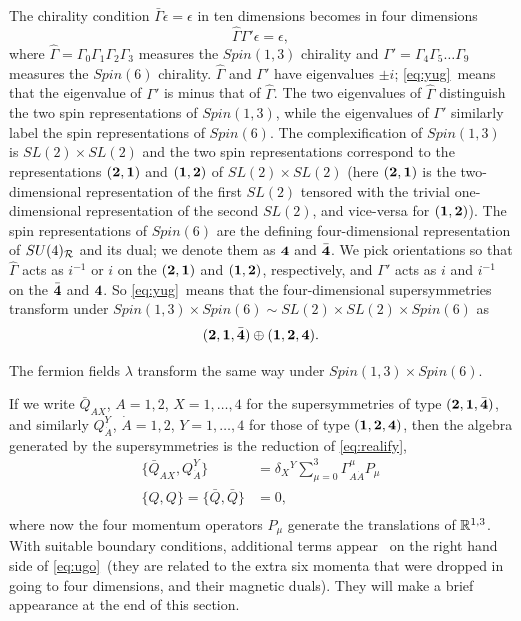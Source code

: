 \def\btwo{{\bf 2}}
\def\bone{{\bf 1}}
\def\b4{{\bf 4}}
\def\bb4{\bar{\bf 4}}
 The chirality condition $\bar\Gamma\epsilon=\epsilon$ in ten
dimensions becomes in four dimensions %
\setcounter{equation}{12}
\begin{equation}\label{eq:yug}
\hat\Gamma
\Gamma'\epsilon=\epsilon,
\end{equation}
 where
$\hat\Gamma=\Gamma_0\Gamma_1\Gamma_2\Gamma_3$ measures the
$Spin(1,3)$ chirality and $\Gamma'=\Gamma_4\Gamma_5\dots\Gamma_9$
measures the $Spin(6)$ chirality. $\hat \Gamma$ and $\Gamma'$ have
eigenvalues $\pm i$; \eqref{eq:yug}\ means that the eigenvalue of $\Gamma'$
is minus that of $\hat \Gamma$. The two eigenvalues of
$\hat\Gamma$ distinguish the two spin representations  of
$Spin(1,3)$, while the eigenvalues of $\Gamma'$ similarly label
the spin representations of $Spin(6)$. The complexification of
$Spin(1,3)$ is $SL(2)\times SL(2)$ and the two spin
representations correspond to the representations $({\bf 2},{\bf
1})$ and $({\bf 1},{\bf 2})$ of $SL(2)\times SL(2)$ (here $({\bf
2},{\bf 1})$ is the two-dimensional representation of the first
$SL(2)$ tensored with the trivial one-dimensional representation
of the second $SL(2)$, and vice-versa for $(\bone,\btwo)$). The
spin representations of $Spin(6)$ are the defining
four-dimensional representation of $SU(4)_{{\cal R}}$ and its
dual; we denote them as ${\bf 4}$ and $\bar{\bf 4}$. We pick
orientations so that $\hat \Gamma$ acts as $i^{-1}$ or $i$ on the
$({\bf 2},{\bf 1})$ and $({\bf 1},{\bf 2})$, respectively, and
$\Gamma'$ acts as $i$ and $i^{-1}$ on the $\bar {\bf 4}$ and ${\bf
4}$.
 So
\eqref{eq:yug}\ means that the four-dimensional supersymmetries transform
under $Spin(1,3)\times Spin(6)\sim SL(2)\times SL(2)\times
Spin(6)$ as %
\setcounter{equation}{13}
\begin{equation}\label{eq:jugo}
(\btwo,\bone,\bb4)\oplus (\bone,\btwo,\b4).
\end{equation}

The fermion fields $\lambda$ transform the same way under
$Spin(1,3)\times Spin(6)$.

If we write $\bar Q_{AX}$, $A=1,2$, $X=1,\dots, 4$ for the
supersymmetries of type $({\bf 2},\bone,\bar{\bf 4})$, and
similarly $ Q_{\dot A }^Y$, $\dot A=1,2$, $Y=1,\dots,4$ for those
of type $(\bone,{\bf 2},{\bf  4})$, then the algebra generated by
the supersymmetries is the reduction of \eqref{eq:realify},
\setcounter{equation}{14}
\begin{equation}\label{eq:ugo}
\begin{aligned}\{\bar Q_{AX}, Q_{\dot A}^
Y\}&=\delta_X{}^Y\sum_{\mu=0}^3\Gamma^\mu_{A\dot A}P_\mu\\
\{Q,Q\}=\{\bar Q,\bar Q\}&=0,\\\end{aligned}
\end{equation}
 where now the four momentum
operators $P_\mu$ generate the translations of $\Bbb{R}^{1,3}$.
With suitable boundary conditions, additional terms appear  \cite{ref13}\
on the right hand side of \eqref{eq:ugo}\ (they are related to the extra six
momenta that were dropped in going to four dimensions, and their
magnetic duals).  They will make a brief appearance at the end of
this section.
